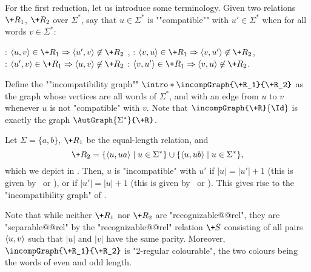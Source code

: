 \AP For the first reduction, let us introduce some terminology.
Given two relations $\+R_1$, $\+R_2$ over $\Sigma^*$, say that
$u \in \Sigma^*$ is ""compatible"" with
$u' \in \Sigma^*$ when for all words $v \in \Sigma^*$:
\begin{center}
    \intro*\compL: $\tup{u,v} \in \+R_1 \Rightarrow \tup{u',v} \not\in \+R_2$%
    ,\hphantom{\text{ \fancyand }}
    \intro*\compR: $\tup{v,u} \in \+R_1 \Rightarrow \tup{v,u'} \not\in \+R_2$,\\
    \intro*\compLpr: $\tup{u',v} \in \+R_1 \Rightarrow \tup{u,v} \not\in \+R_2$%
    \hphantom{,}\text{ \fancyand }
    \intro*\compRpr: $\tup{v,u'} \in \+R_1 \Rightarrow \tup{v,u} \not\in \+R_2$.
\end{center}
\AP
Define the ""incompatibility graph"" $\intro*\incompGraph{\+R_1}{\+R_2}$
as the graph whose vertices are all words of $\Sigma^*$,
and with an edge from $u$ to $v$ whenever $u$ is not "compatible" with $v$.
Note that $\incompGraph{\+R}{\Id}$ is exactly the graph $\AutGraph{\Sigma^*}{\+R}$.

\begin{example}%
    \AP\label{ex:equal-length-plusone}%
    Let $\Sigma = \{a,b\}$, $\+R_1$ be the equal-length relation,
    and
    \[
        \+R_2 = \{\tup{u, ua} \mid u \in \Sigma^*\} \cup \{\tup{u, ub} \mid u \in \Sigma^*\},
    \]
    which we depict in .
    Then, $u$ is "incompatible" with $u'$ if $|u| = |u'|+1$ (this is given by \compL~or \compR),
    or if $|u'| = |u|+1$ (this is given by \compLpr~or \compRpr).
    This gives rise to the "incompatibility graph" of
    .
    \begin{marginfigure}[-8em]%
        \centering
        \begin{tikzpicture}
            
        \end{tikzpicture}
        \caption{\AP\label{fig:equal-length-plusone-relation}%
            The relation $\+R_2$ of ,
            restricted to words of length at most 2.
        }
    \end{marginfigure}%
    \begin{marginfigure}%
        \centering
        \begin{tikzpicture}
            
        \end{tikzpicture}
        \caption{\AP\label{fig:equal-length-plusone-incompatibility}%
            "Incompatibility graph" $\incompGraph{\+R_1}{\+R_2}$ and its "2-regular colouring".%
        }
    \end{marginfigure}%

    Note that while neither $\+R_1$ nor $\+R_2$ are "recognizable@@rel",
    they are "separable@@rel" by the "recognizable@@rel" relation
    $\+S$ consisting of all pairs $\tup{u,v}$ such that $|u|$ and $|v|$ have the same parity.
    Moreover, $\incompGraph{\+R_1}{\+R_2}$ is "2-regular colourable", the two colours being
    the words of even and odd length.
\end{example}

